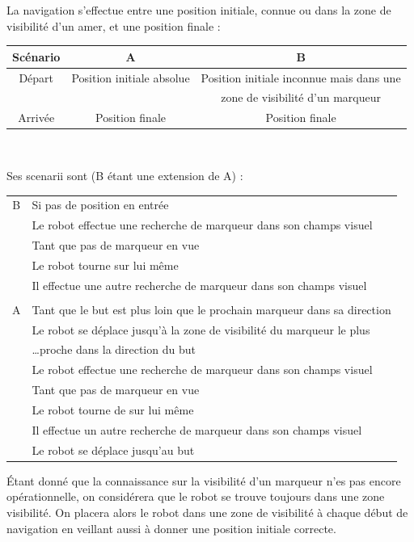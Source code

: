 \documentclass[10pt,a4paper]{article}
\begin{document}
La navigation s'effectue entre une position initiale, connue ou dans la zone de visibilité d'un amer, et une position finale : 

\begin{center}
\begin{tabular}{c|c|c}
Scénario & A & B \\ \hline
Départ & Position initiale absolue & Position initiale inconnue mais dans une \\ 
  &  & zone de visibilité d'un marqueur \\  \hline
Arrivée & Position finale & Position finale 
\end{tabular}\\
\end{center}

\noindent Ses scenarii sont (B étant une extension de A) : \\

\begin{tabular}{cl}
B & Si pas de position en entrée  \\
  & \indent Le robot effectue une recherche de marqueur dans son champs visuel \\
  & \indent Tant que pas de marqueur en vue \\
  & \indent \indent Le robot tourne sur lui même \\
  & \indent Il effectue une autre recherche de marqueur dans son champs visuel \\
& \\
A & Tant que le but est plus loin que le prochain marqueur dans sa direction \\
  & \indent Le robot se déplace jusqu'à la zone de visibilité du marqueur le plus \\
  & \indent \ldots proche dans la direction du but  \\
  & Le robot effectue une recherche de marqueur dans son champs visuel \\
  & Tant que pas de marqueur en vue  \\
  & \indent Le robot tourne de sur lui même  \\
  & \indent Il effectue un autre recherche de marqueur dans son champs visuel \\
  & Le robot se déplace jusqu'au but  \\
\end{tabular}

Étant donné que la connaissance sur la visibilité d'un marqueur n'es pas encore opérationnelle, on considérera que le robot se trouve toujours dans une zone visibilité. On placera alors le robot dans une zone de visibilité à chaque début de navigation en veillant aussi à donner une position initiale correcte.
\end{document}
